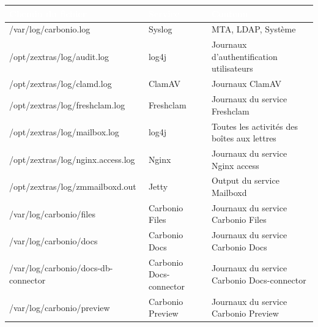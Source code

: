 \documentclass[11pt,a4paper]{report}
\newcommand{\tblhead}[1]{\textcolor{white}{\textbf{#1}}}
\begin{document}
\begin{longtable}{|p{5.3cm}|p{5.3cm}|p{5.3cm}|}
\hline
\rowcolor{primary}\tblhead{Chemin du fichier } & \tblhead{Service } & \tblhead{Contenu } \\
\hline
\endhead
/var/log/carbonio.\allowbreak{}log & Syslog & MTA, LDAP, Système \\
\hline
/opt/zextras/log/audit.\allowbreak{}log & log4j & Journaux d'authentification utilisateurs \\
\hline
/opt/zextras/log/clamd.\allowbreak{}log & ClamAV & Journaux ClamAV \\
\hline
/opt/zextras/log/freshclam.\allowbreak{}log & Freshclam & Journaux du service Freshclam \\
\hline
/opt/zextras/log/mailbox.\allowbreak{}log & log4j & Toutes les activités des boîtes aux lettres \\
\hline
/opt/zextras/log/nginx.\allowbreak{}access.\allowbreak{}log & Nginx & Journaux du service Nginx access \\
\hline
/opt/zextras/log/zmmailboxd.\allowbreak{}out & Jetty & Output du service Mailboxd \\
\hline
/var/log/carbonio/files & Carbonio Files & Journaux du service Carbonio Files \\
\hline
/var/log/carbonio/docs & Carbonio Docs & Journaux du service Carbonio Docs \\
\hline
/var/log/carbonio/docs-\allowbreak{}db-\allowbreak{}connector & Carbonio Docs-\allowbreak{}connector & Journaux du service Carbonio Docs-\allowbreak{}connector \\
\hline
/var/log/carbonio/preview & Carbonio Preview & Journaux du service Carbonio Preview \\
\hline
\end{longtable}
\end{document}
